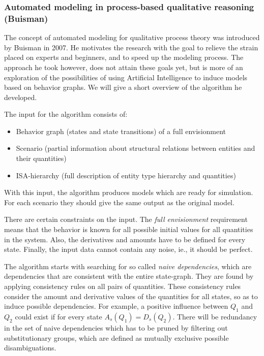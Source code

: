 \documentclass{article} %
\begin{document}
\subsubsection{Automated modeling in process-based qualitative reasoning
(Buisman)}

The concept of automated modeling for qualitative process theory was
introduced by Buisman \cite{buisman} in 2007. He motivates the research with
the goal to relieve the strain placed on experts and beginners, and to speed
up the modeling process. The approach he took however, does not attain these
goals yet, but is more of an exploration of the possibilities of using
Artificial Intelligence to induce models based on behavior graphs. We will
give a short overview of the algorithm he developed.

The input for the algorithm consists of:

\begin{itemize}

\item Behavior graph (states and state transitions) of a full envisionment

\item Scenario (partial information about structural relations between entities and their quantities)

\item ISA-hierarchy (full description of entity type hierarchy and quantities)

\end{itemize}

With this input, the algorithm produces models which are ready for simulation.
For each scenario they should give the same output as the original model.

There are certain constraints on the input. The \emph{full envisionment}
requirement means that the behavior is known for all possible initial values
for all quantities in the system. Also, the derivatives and amounts have to be
defined for every state. Finally, the input data cannot contain any noise,
ie., it should be perfect.

The algorithm starts with searching for so called \emph{naive dependencies},
which are dependencies that are consistent with the entire state-graph. They
are found by applying consistency rules on all pairs of quantities. These
consistency rules consider the amount and derivative values of the quantities
for all states, so as to induce possible dependencies. For example, a positive
influence between $Q_1$ and $Q_2$ could exist if for every state $A_s(Q_1) =
D_s(Q_2)$.  There will be redundancy in the set of naive dependencies which
has to be pruned by filtering out substitutionary groups, which are defined as
mutually exclusive possible disambiguations. 
\end{document}
